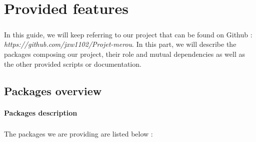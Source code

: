\documentclass{report}
\begin{document}
\restoregeometry
\tableofcontents
{}
\chapter{Provided features}

\paragraph{}
\hspace{4mm}In this guide, we will keep referring to our project that can be found on Github :
\textit{https://github.com/jxw1102/Projet-merou}.
In this part, we will describe the packages composing our project, their role and mutual dependencies as well as
the other provided scripts or documentation.

\section{Packages overview}

\subsubsection{Packages description}

\paragraph{}
\hspace{4mm}The packages we are providing are listed below :
\end{document}
